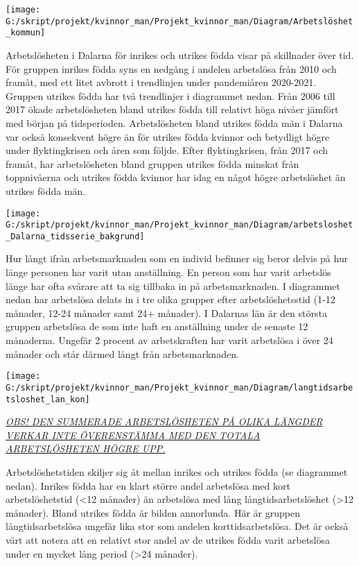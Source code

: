 \documentclass[
]{article}
\begin{document}
\begin{center}\texttt{[image: G:/skript/projekt/kvinnor\_man/Projekt\_kvinnor\_man/Diagram/Arbetslöshet\_kommun]} \end{center}

Arbetslösheten i Dalarna för inrikes och utrikes födda visar på
skillnader över tid. För gruppen inrikes födda syns en nedgång i andelen
arbetslösa från 2010 och framåt, med ett litet avbrott i trendlinjen
under pandemiåren 2020-2021. Gruppen utrikes födda har två trendlinjer i
diagrammet nedan. Från 2006 till 2017 ökade arbetslösheten bland utrikes
födda till relativt höga nivåer jämfört med början på tidsperioden.
Arbetslösheten bland utrikes födda män i Dalarna var också konsekvent
högre än för utrikes födda kvinnor och betydligt högre under
flyktingkrisen och åren som följde. Efter flyktingkrisen, från 2017 och
framåt, har arbetslösheten bland gruppen utrikes födda minskat från
toppnivåerna och utrikes födda kvinnor har idag en något högre
arbetslöshet än utrikes födda män.

\begin{center}\texttt{[image: G:/skript/projekt/kvinnor\_man/Projekt\_kvinnor\_man/Diagram/arbetsloshet\_Dalarna\_tidsserie\_bakgrund]} \end{center}

Hur långt ifrån arbetsmarknaden som en individ befinner sig beror delvis
på hur länge personen har varit utan anställning. En person som har
varit arbetslös länge har ofta svårare att ta sig tillbaka in på
arbetsmarknaden. I diagrammet nedan har arbetslösa delats in i tre olika
grupper efter arbetslöshetsstid (1-12 månader, 12-24 månader samt 24+
månader). I Dalarnas län är den största gruppen arbetslösa de som inte
haft en anställning under de senaste 12 månaderna. Ungefär 2 procent av
arbetskraften har varit arbetslösa i över 24 månader och står därmed
långt från arbetsmarknaden.

\begin{center}\texttt{[image: G:/skript/projekt/kvinnor\_man/Projekt\_kvinnor\_man/Diagram/langtidsarbetsloshet\_lan\_kon]} \end{center}

\uline{\emph{OBS! DEN SUMMERADE ARBETSLÖSHETEN PÅ OLIKA LÄNGDER VERKAR
INTE ÖVERENSTÄMMA MED DEN TOTALA ARBETSLÖSHETEN HÖGRE UPP.}}

Arbetslöshetstiden skiljer sig åt mellan inrikes och utrikes födda (se
diagrammet nedan). Inrikes födda har en klart större andel arbetslösa
med kort arbetslöshetstid (\textless12 månader) än arbetslösa med lång
långtidsarbetslöshet (\textgreater12 månader). Bland utrikes födda är
bilden annorlunda. Här är gruppen långtidsarbetslösa ungefär lika stor
som andelen korttidsarbetslösa. Det är också värt att notera att en
relativt stor andel av de utrikes födda varit arbetslösa under en mycket
lång period (\textgreater24 månader).
\end{document}
